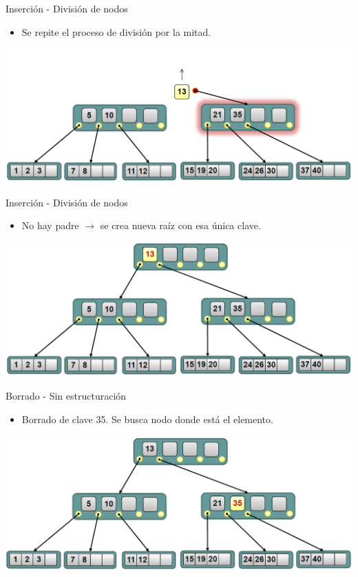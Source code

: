 \documentclass[handout]{beamer} %
\newcommand{\redb}[1]{{\color{red!70!black}{#1}}}
\begin{document}
\begin{frame}{Inserción - División de nodos}
    \begin{itemize}
        \item Se repite el proceso de división por la mitad.
    \end{itemize}
    \begin{center}
        \includegraphics[width=\textwidth]{./image/cap3/b-tree-insert9}
    \end{center}
\end{frame}

\begin{frame}{Inserción - División de nodos}
    \begin{itemize}
        \item No hay padre $\to$ se crea nueva raíz con esa única clave. \redb{Fin}
    \end{itemize}
    \begin{center}
        \includegraphics[width=\textwidth]{./image/cap3/b-tree-insert10}
    \end{center}
\end{frame}

\begin{frame}{Borrado - Sin estructuración}
    \begin{itemize}
        \item Borrado de clave 35. Se busca nodo donde está el elemento.
    \end{itemize}
    \begin{center}
        \includegraphics[width=\textwidth]{./image/cap3/b-tree-delete1}
    \end{center}
\end{frame}
\end{document}
